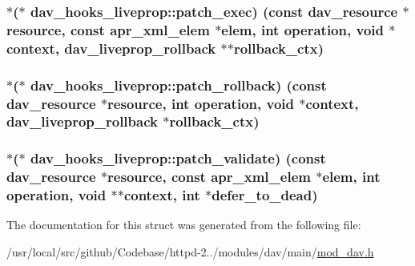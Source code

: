 \subsubsection[{\texorpdfstring{patch\+\_\+exec}{patch_exec}}]{$\ast$($\ast$ dav\+\_\+hooks\+\_\+liveprop\+::patch\+\_\+exec) (const {\bf dav\+\_\+resource} $\ast${\bf resource}, const {\bf apr\+\_\+xml\+\_\+elem} $\ast${\bf elem}, {\bf int} {\bf operation}, {\bf void} $\ast${\bf context}, {\bf dav\+\_\+liveprop\+\_\+rollback} $\ast$$\ast$rollback\+\_\+ctx)}\hypertarget{structdav__hooks__liveprop_a8a61b9620f8de09675b2ea148661be77}{}\label{structdav__hooks__liveprop_a8a61b9620f8de09675b2ea148661be77}
\subsubsection[{\texorpdfstring{patch\+\_\+rollback}{patch_rollback}}]{$\ast$($\ast$ dav\+\_\+hooks\+\_\+liveprop\+::patch\+\_\+rollback) (const {\bf dav\+\_\+resource} $\ast${\bf resource}, {\bf int} {\bf operation}, {\bf void} $\ast${\bf context}, {\bf dav\+\_\+liveprop\+\_\+rollback} $\ast$rollback\+\_\+ctx)}\hypertarget{structdav__hooks__liveprop_a59c89324498ad6f5c8e754d3f5d0068a}{}\label{structdav__hooks__liveprop_a59c89324498ad6f5c8e754d3f5d0068a}
\subsubsection[{\texorpdfstring{patch\+\_\+validate}{patch_validate}}]{$\ast$($\ast$ dav\+\_\+hooks\+\_\+liveprop\+::patch\+\_\+validate) (const {\bf dav\+\_\+resource} $\ast${\bf resource}, const {\bf apr\+\_\+xml\+\_\+elem} $\ast${\bf elem}, {\bf int} {\bf operation}, {\bf void} $\ast$$\ast${\bf context}, {\bf int} $\ast$defer\+\_\+to\+\_\+dead)}\hypertarget{structdav__hooks__liveprop_a6c48781258f45a6fa4b3548c56557916}{}\label{structdav__hooks__liveprop_a6c48781258f45a6fa4b3548c56557916}


The documentation for this struct was generated from the following file\+:\begin{DoxyCompactItemize}
\item 
/usr/local/src/github/\+Codebase/httpd-\/2../modules/dav/main/\hyperlink{mod__dav_8h}{mod\+\_\+dav.\+h}\end{DoxyCompactItemize}
